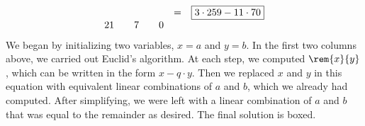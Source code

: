 \documentclass[handout]{mcs}
\begin{document}
{\[\begin{array}{ccccrcl}
&&&&            & = &   \fbox{$3 \cdot 259 - 11 \cdot 70$} \\
21 && 7 && 0
\end{array}
\]
We began by initializing two variables, $x = a$ and $y = b$.  In the
first two columns above, we carried out Euclid's algorithm.  At each
step, we computed $\rem{x}{y}$, which can be written in the form $x -
q \cdot y$. \iffalse (Remember that the Division Algorithm says $x = q
\cdot y + r$, where $r$ is the remainder.  We get $r = x - q \cdot y$
by rearranging terms.)\fi Then we replaced $x$ and $y$ in this
equation with equivalent linear combinations of $a$ and $b$, which we
already had computed.  After simplifying, we were left with a linear
combination of $a$ and $b$ that was equal to the remainder as desired.
The final solution is boxed.}



\end{document}
